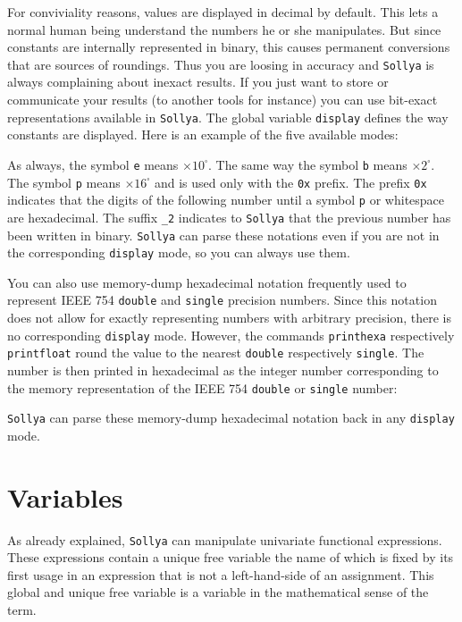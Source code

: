 \documentclass[a4paper]{article}
\newcommand{\com}[1]{\texttt{#1}}
\newcommand{\key}[1]{\texttt{#1}}
\newcommand{\sollya}{\texttt{Sollya}\xspace}
\begin{document}


For conviviality reasons, values are displayed in decimal by default. This lets a normal human being understand the numbers he or she manipulates. But since constants are internally represented in binary, this causes permanent conversions that are sources of roundings. Thus you are loosing in accuracy and \sollya is always complaining about inexact results. If you just want to store or communicate your results (to another tools for instance) you can use bit-exact representations available in \sollya. The global variable \key{display} defines the way constants are displayed. Here is an example of the five available modes:



As always, the symbol \texttt{e} means $\times 10^\square $. The same way the symbol \texttt{b} means  $\times 2^\square $. The symbol \texttt{p} means $\times 16^\square$ and is used only with the \texttt{0x} prefix. The prefix \texttt{0x} indicates that the digits of the following number until 
a symbol \texttt{p} or whitespace are hexadecimal. The suffix \texttt{\_2} indicates to \sollya that the previous number has been written in binary. \sollya can parse these notations even if you are not in the corresponding \key{display} mode, so you can always use them.

You can also use memory-dump hexadecimal notation frequently used to represent IEEE 754 \texttt{double} and \texttt{single} precision numbers. Since this notation does not allow for exactly representing numbers with arbitrary precision, there is no corresponding \key{display} mode. However, the commands \com{printhexa} respectively \com{printfloat} round the value to the nearest \texttt{double} respectively \texttt{single}. The number is then printed in hexadecimal as the integer number corresponding to the memory representation of the IEEE 754 \texttt{double} or \texttt{single} number:



\sollya can parse these memory-dump hexadecimal notation back in any \key{display} mode.

\section{Variables}\label{variables}

As already explained, \sollya can manipulate univariate functional
expressions. These expressions contain a unique free variable the name
of which is fixed by its first usage in an expression that is not a
left-hand-side of an assignment. This global and unique free variable is 
a variable in the mathematical sense of the term. 
\end{document}
